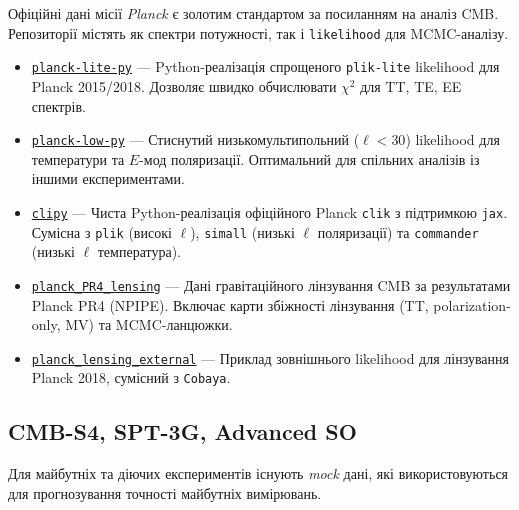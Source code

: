 Офіційні дані місії \emph{Planck} є золотим стандартом за посиланням на аналіз CMB.
Репозиторії містять як спектри потужності, так і \texttt{likelihood} для
MCMC-аналізу.

\begin{itemize}
    \item \href{https://github.com/heatherprince/planck-lite-py}{\texttt{planck-lite-py}} ---
          Python-реалізація спрощеного \texttt{plik-lite} likelihood для
          Planck 2015/2018. Дозволяє швидко обчислювати $\chi^2$ для
          TT, TE, EE спектрів. \cite{prince_dunkley_2019}

    \item \href{https://github.com/heatherprince/planck-low-py}{\texttt{planck-low-py}} ---
          Стиснутий низькомультипольний ($\ell<30$) likelihood для
          температури та $E$-мод поляризації. Оптимальний для спільних
          аналізів із іншими експериментами. \cite{prince_low_2021}

    \item \href{https://github.com/benabed/clipy}{\texttt{clipy}} ---
          Чиста Python-реалізація офіційного Planck \texttt{clik} з
          підтримкою \texttt{jax}. Сумісна з \texttt{plik} (високі $\ell$),
          \texttt{simall} (низькі $\ell$ поляризації) та
          \texttt{commander} (низькі $\ell$ температура). \cite{benabed_2025}

    \item \href{https://github.com/carronj/planck_PR4_lensing}{\texttt{planck\_PR4\_lensing}} ---
          Дані гравітаційного лінзування CMB за результатами
          Planck PR4 (NPIPE). Включає карти збіжності лінзування
          (TT, polarization-only, MV) та MCMC-ланцюжки. \cite{carron_2022}

    \item \href{https://github.com/CobayaSampler/planck_lensing_external}{\texttt{planck\_lensing\_external}} ---
          Приклад зовнішнього likelihood для лінзування Planck 2018,
          сумісний з \texttt{Cobaya}.
\end{itemize}

\subsection*{CMB-S4, SPT-3G, Advanced SO}

Для майбутніх та діючих експериментів існують \emph{mock} дані, які
використовуються для прогнозування точності майбутніх вимірювань.

